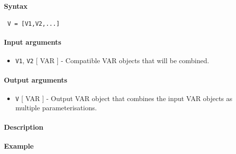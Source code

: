 


	\paragraph{Syntax}
 
 \begin{verbatim}
 V = [V1,V2,...]
 \end{verbatim}
 
 \paragraph{Input arguments}
 
 \begin{itemize}
 \item
   \texttt{V1}, \texttt{V2} {[} VAR {]} - Compatible VAR objects that
   will be combined.
 \end{itemize}
 
 \paragraph{Output arguments}
 
 \begin{itemize}
 \item
   \texttt{V} {[} VAR {]} - Output VAR object that combines the input VAR
   objects as multiple parameterisations.
 \end{itemize}
 
 \paragraph{Description}
 
 \paragraph{Example}


